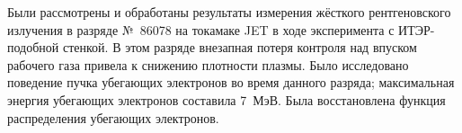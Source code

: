 Были рассмотрены и обработаны результаты измерения жёсткого рентгеновского излучения в разряде №~86078 на токамаке JET в ходе эксперимента с ИТЭР-подобной стенкой. В этом разряде внезапная потеря контроля над впуском рабочего газа привела к снижению плотности плазмы. Было исследовано поведение пучка убегающих электронов во время данного разряда; максимальная энергия убегающих электронов составила 7~МэВ. Была восстановлена функция распределения убегающих электронов.


\clearpage
